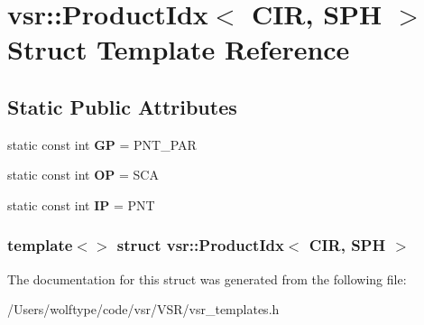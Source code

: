 \hypertarget{structvsr_1_1_product_idx_3_01_c_i_r_00_01_s_p_h_01_4}{\section{vsr\-:\-:Product\-Idx$<$ C\-I\-R, S\-P\-H $>$ Struct Template Reference}
\label{structvsr_1_1_product_idx_3_01_c_i_r_00_01_s_p_h_01_4}
}
\subsection*{Static Public Attributes}
\begin{DoxyCompactItemize}
\item 
\hypertarget{structvsr_1_1_product_idx_3_01_c_i_r_00_01_s_p_h_01_4_a2a802f88a198fcc70d8b66ae97379db9}{static const int {\bfseries G\-P} = P\-N\-T\-\_\-\-P\-A\-R}\label{structvsr_1_1_product_idx_3_01_c_i_r_00_01_s_p_h_01_4_a2a802f88a198fcc70d8b66ae97379db9}

\item 
\hypertarget{structvsr_1_1_product_idx_3_01_c_i_r_00_01_s_p_h_01_4_abed41306d41093e517afcf999e6d66e5}{static const int {\bfseries O\-P} = S\-C\-A}\label{structvsr_1_1_product_idx_3_01_c_i_r_00_01_s_p_h_01_4_abed41306d41093e517afcf999e6d66e5}

\item 
\hypertarget{structvsr_1_1_product_idx_3_01_c_i_r_00_01_s_p_h_01_4_ad2a93284d1a6f10175f0fe768caf4a33}{static const int {\bfseries I\-P} = P\-N\-T}\label{structvsr_1_1_product_idx_3_01_c_i_r_00_01_s_p_h_01_4_ad2a93284d1a6f10175f0fe768caf4a33}

\end{DoxyCompactItemize}
\subsubsection*{template$<$$>$ struct vsr\-::\-Product\-Idx$<$ C\-I\-R, S\-P\-H $>$}



The documentation for this struct was generated from the following file\-:\begin{DoxyCompactItemize}
\item 
/\-Users/wolftype/code/vsr/\-V\-S\-R/vsr\-\_\-templates.\-h\end{DoxyCompactItemize}
